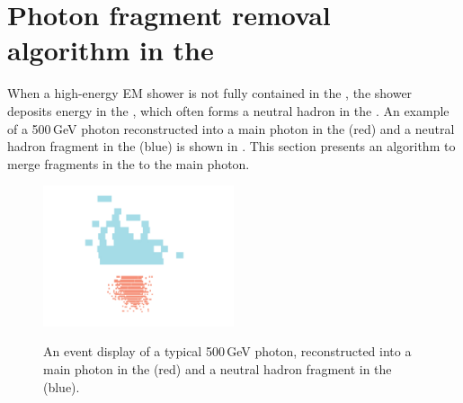 \begin{table}[htbp]
\caption[The cuts for photon fragment removal algorithm in the \ECAL.]%
{The cuts for merging photon$-$photon-fragment pairs and photon$-$neutral-fragment pairs for both low-energy and high-energy fragments, immediately after photon reconstruction. }
\label{tab:photonFragRemovalCuts2}
\end{table}


\section{Photon fragment removal algorithm in the \HCAL}
\label{sec:photonHighEFragRemoval}



When a high-energy EM shower is not fully contained in the \ECAL, the shower deposits energy in the \HCAL, which often forms a neutral hadron in the \HCAL. An example of a 500\,GeV photon reconstructed into a main photon in the \ECAL (red) and a neutral hadron fragment in the \HCAL (blue) is shown in . This section presents an algorithm to merge fragments in the \HCAL to the main photon.



\begin{figure}[tbph]
\centering
{\includegraphics[width=0.5\textwidth]{photon/hcalfrag2}}%
\caption{An event display of a typical 500\,GeV photon, reconstructed into a main photon in the \ECAL (red) and a neutral hadron fragment in the \HCAL (blue).}
\label{fig:photonEvtDspHCalFrag}
\end{figure}

